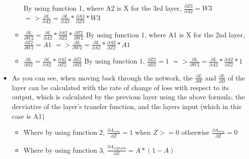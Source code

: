 \documentclass[./project-report/src/latex/project-report.tex]{subfiles}
\begin{document}
\begin{itemize}
\begin{itemize}
              \newline
              By using function 1, where A2 is X for the 3rd layer, $\frac{\partial{Z3}}{\partial{A2}} = W3$
              \vspace{1mm}
              \newline
              $=> \frac{\partial{L}}{\partial{A2}} =  \frac{\partial{L}}{\partial{A3}} * \frac{\partial{A3}}{\partial{Z3}} * W3$
        \item $\frac{\partial{L}}{\partial{W2}} = \frac{\partial{L}}{\partial{A2}} * \frac{\partial{A2}}{\partial{Z2}} * \frac{\partial{Z2}}{\partial{W2}}$
              \vspace{1mm}
              \newline
              By using function 1, where A1 is X for the 2nd layer, $\frac{\partial{Z2}}{\partial{W2}} = A1$
              \vspace{1mm}
              \newline
              $=> \frac{\partial{L}}{\partial{W2}} = \frac{\partial{L}}{\partial{A2}} * \frac{\partial{A2}}{\partial{Z2}} * A1$
        \item $\frac{\partial{L}}{\partial{B2}} = \frac{\partial{L}}{\partial{A2}} * \frac{\partial{A2}}{\partial{Z2}} * \frac{\partial{Z2}}{\partial{B2}}$
              \vspace{1mm}
              \newline
              By using function 1, $\frac{\partial{Z2}}{\partial{B2}} = 1$
              \vspace{1mm}
              \newline
              $=> \frac{\partial{L}}{\partial{W2}} = \frac{\partial{L}}{\partial{A2}} * \frac{\partial{A2}}{\partial{Z2}} * 1$
    \end{itemize}
    \item As you can see, when moving back through the network, the $\frac{\partial{L}}{\partial{W}}$ and $\frac{\partial{L}}{\partial{B}}$ of the layer can be 
          calculated with the rate of change of loss with respect to its output, which is calculated by the previous layer using the above formula; the derviative of 
          the layer's transfer function, and the layers input (which in this case is A1)
    \begin{itemize}
        \item Where by using function 2, $\frac{\partial{A_{relu}}}{\partial{Z}} = 1$ when $Z >= 0$ otherwise $\frac{\partial{A_{relu}}}{\partial{Z}} = 0$
        \item Where by using function 3, $\frac{\partial{A_{sigmoid}}}{\partial{Z}} = A * (1 - A)$

\end{itemize}
\end{itemize}
\end{document}
